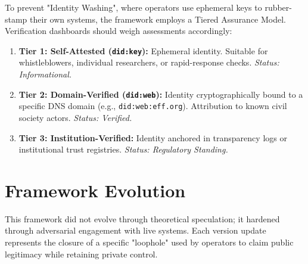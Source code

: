 \documentclass{article}
\begin{document}
To prevent "Identity Washing", where operators use ephemeral keys to rubber-stamp their own systems, the framework employs a Tiered Assurance Model. Verification dashboards should weigh assessments accordingly:

\begin{enumerate}
    \item \textbf{Tier 1: Self-Attested (\texttt{did:key}):} Ephemeral identity. Suitable for whistleblowers, individual researchers, or rapid-response checks. \textit{Status: Informational.}
    \item \textbf{Tier 2: Domain-Verified (\texttt{did:web}):} Identity cryptographically bound to a specific DNS domain (e.g., \texttt{did:web:eff.org}). Attribution to known civil society actors. \textit{Status: Verified.}
    \item \textbf{Tier 3: Institution-Verified:} Identity anchored in transparency logs or institutional trust registries. \textit{Status: Regulatory Standing.}
\end{enumerate}

\section{Framework Evolution}
\label{appendix:evolution}

This framework did not evolve through theoretical speculation; it hardened through adversarial engagement with live systems. Each version update represents the closure of a specific "loophole" used by operators to claim public legitimacy while retaining private control.
\end{document}
